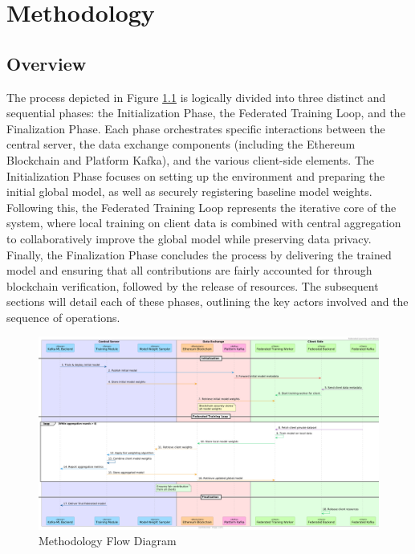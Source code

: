 \chapter{Methodology}

\section{Overview}

The process depicted in Figure \ref{fig:methodology_flow} is logically divided into three distinct and sequential phases: the Initialization Phase, the Federated Training Loop, and the Finalization Phase. Each phase orchestrates specific interactions between the central server, the data exchange components (including the Ethereum Blockchain and Platform Kafka), and the various client-side elements. The Initialization Phase focuses on setting up the environment and preparing the initial global model, as well as securely registering baseline model weights. Following this, the Federated Training Loop represents the iterative core of the system, where local training on client data is combined with central aggregation to collaboratively improve the global model while preserving data privacy. Finally, the Finalization Phase concludes the process by delivering the trained model and ensuring that all contributions are fairly accounted for through blockchain verification, followed by the release of resources. The subsequent sections will detail each of these phases, outlining the key actors involved and the sequence of operations.


\begin{figure}
    \centering
    \includegraphics[scale=0.185]{MWP-Project Report Template - BD-ML-June25/methodology.png} %
    \caption{Methodology Flow Diagram}
    \label{fig:methodology_flow} %
\end{figure}



